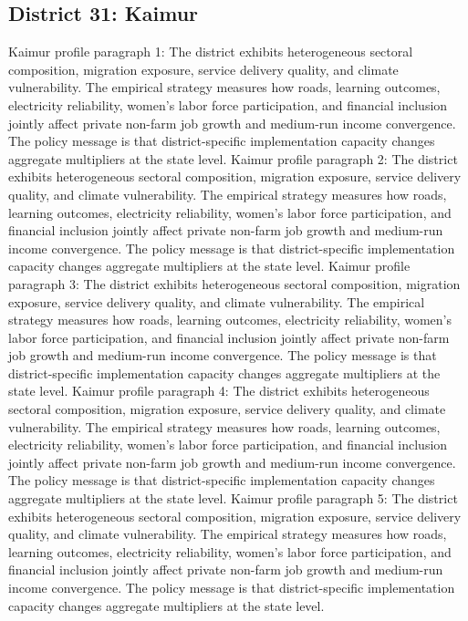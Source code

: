 \documentclass[preprint,12pt]{elsarticle}
\begin{document}
\subsection{District 31: Kaimur}
Kaimur profile paragraph 1: The district exhibits heterogeneous sectoral composition, migration exposure, service delivery quality, and climate vulnerability. The empirical strategy measures how roads, learning outcomes, electricity reliability, women's labor force participation, and financial inclusion jointly affect private non-farm job growth and medium-run income convergence. The policy message is that district-specific implementation capacity changes aggregate multipliers at the state level.
Kaimur profile paragraph 2: The district exhibits heterogeneous sectoral composition, migration exposure, service delivery quality, and climate vulnerability. The empirical strategy measures how roads, learning outcomes, electricity reliability, women's labor force participation, and financial inclusion jointly affect private non-farm job growth and medium-run income convergence. The policy message is that district-specific implementation capacity changes aggregate multipliers at the state level.
Kaimur profile paragraph 3: The district exhibits heterogeneous sectoral composition, migration exposure, service delivery quality, and climate vulnerability. The empirical strategy measures how roads, learning outcomes, electricity reliability, women's labor force participation, and financial inclusion jointly affect private non-farm job growth and medium-run income convergence. The policy message is that district-specific implementation capacity changes aggregate multipliers at the state level.
Kaimur profile paragraph 4: The district exhibits heterogeneous sectoral composition, migration exposure, service delivery quality, and climate vulnerability. The empirical strategy measures how roads, learning outcomes, electricity reliability, women's labor force participation, and financial inclusion jointly affect private non-farm job growth and medium-run income convergence. The policy message is that district-specific implementation capacity changes aggregate multipliers at the state level.
Kaimur profile paragraph 5: The district exhibits heterogeneous sectoral composition, migration exposure, service delivery quality, and climate vulnerability. The empirical strategy measures how roads, learning outcomes, electricity reliability, women's labor force participation, and financial inclusion jointly affect private non-farm job growth and medium-run income convergence. The policy message is that district-specific implementation capacity changes aggregate multipliers at the state level.
\end{document}
